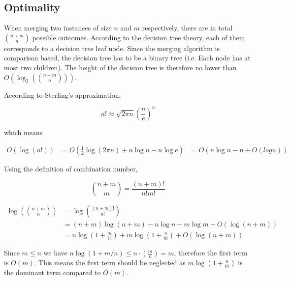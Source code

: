 \documentclass[12pt]{article}
\begin{document}

\subsection{Optimality}


When merging two instances of size $n$ and $m$ respectively, there are in total $\binom{n+m}{n}$ possible outcomes. According to the decision tree theory, each of them corresponds to a decision tree leaf node. Since the merging algorithm is comparison based, the decision tree has to be a binary tree (i.e. Each node has at most two children). The height of the decision tree is therefore no lower than $O(\log_2({\binom{n+m}{n}}))$.

According to Sterling's approximation, 

\begin{equation}
    n!\approx \sqrt{2\pi n}(\frac{n}{e})^n
\end{equation}

which means

\begin{equation}
    \begin{aligned}
        O(\log(n!)) &= O(\frac{1}{2}\log(2\pi n) + n\log n - n\log e )
                    &= O(n\log n - n + O(log n))
    \end{aligned}
\end{equation}

Using the definition of combination number, 

\begin{equation}
    \binom{n+m}{m} = \frac{(n+m)!}{n!m!}
\end{equation}

\begin{align}
    \log(\binom{n+m}{n}) &= \log(\frac{(n+m)!}{n!})\\
                         &= (n+m)\log(n+m) - n\log n - m\log m + O(\log (n+m))\\
                         &= n\log(1+\frac{m}{n}) + m\log (1+\frac{n}{m}) + O(\log (n+m))
\end{align}

Since $m\le n$ we have $n\log(1+m/n)\le n\cdot(\frac{m}{n}) = m$, therefore the first term is $O(m)$. This means the first term should be neglected as $m\log(1+\frac{n}{m})$ is the dominant term compared to $O(m)$.
\end{document}
